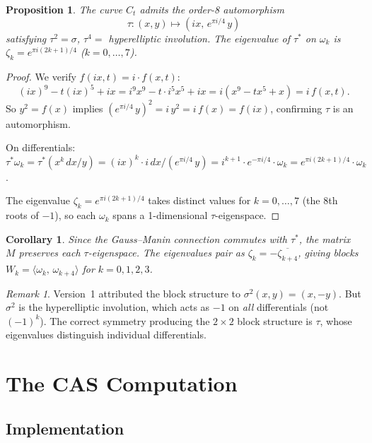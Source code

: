 \documentclass[11pt]{article}
\theoremstyle{plain}
\newtheorem{proposition}[theorem]{Proposition}
\newtheorem{corollary}[theorem]{Corollary}
\theoremstyle{definition}
\theoremstyle{remark}
\newtheorem{remark}[theorem]{Remark}
\begin{document}
\begin{proposition}\label{prop:tau}
The curve $C_t$ admits the order-8 automorphism
\[
  \tau\colon (x,y) \mapsto (ix,\, e^{\pi i/4}\, y)
\]
satisfying $\tau^2 = \sigma$, $\tau^4 = $ hyperelliptic involution.
The eigenvalue of $\tau^*$ on $\omega_k$ is
$\zeta_k = e^{\pi i(2k+1)/4}$ ($k = 0,\ldots,7$).
\end{proposition}

\begin{proof}
We verify $f(ix,t) = i \cdot f(x,t)$:
\[
  (ix)^9 - t(ix)^5 + ix = i^9 x^9 - t \cdot i^5 x^5 + ix
  = i(x^9 - tx^5 + x) = i\, f(x,t).
\]
So $y^2 = f(x)$ implies $(e^{\pi i/4}\, y)^2 = i\, y^2 = i\, f(x)
= f(ix)$, confirming $\tau$ is an automorphism.

On differentials:
$\tau^*\omega_k = \tau^*(x^k\, dx/y) = (ix)^k \cdot i\, dx /
(e^{\pi i/4}\, y) = i^{k+1} \cdot e^{-\pi i/4} \cdot \omega_k
= e^{\pi i(2k+1)/4} \cdot \omega_k$.

The eigenvalue $\zeta_k = e^{\pi i(2k+1)/4}$ takes distinct values
for $k = 0,\ldots,7$ (the 8th roots of $-1$), so each $\omega_k$
spans a 1-dimensional $\tau$-eigenspace.
\end{proof}

\begin{corollary}\label{cor:blocks}
Since the Gauss--Manin connection commutes with $\tau^*$, the matrix
$M$ preserves each $\tau$-eigenspace. The eigenvalues pair as
$\zeta_k = -\overline{\zeta_{k+4}}$, giving blocks
$W_k = \langle\omega_k,\, \omega_{k+4}\rangle$ for $k = 0,1,2,3$.
\end{corollary}

\begin{remark}
Version~1 attributed the block structure to $\sigma^2(x,y) = (x,-y)$.
But $\sigma^2$ is the hyperelliptic involution, which acts as $-1$ on
\emph{all} differentials (not $(-1)^k$). The correct symmetry
producing the $2 \times 2$ block structure is $\tau$, whose eigenvalues
distinguish individual differentials.
\end{remark}

\section{The CAS Computation}\label{sec:computation}

\subsection{Implementation}
\end{document}
